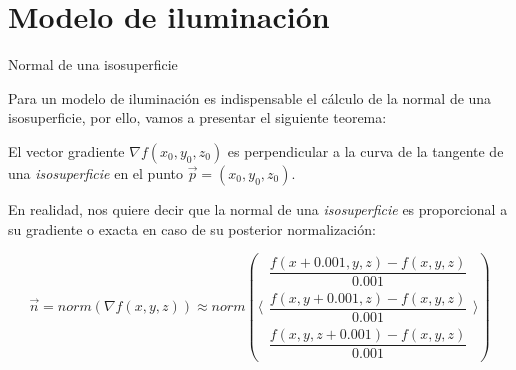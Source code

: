 \section{Modelo de iluminación}

\SectionPage

\begin{frame}{Normal de una isosuperficie}
    
    Para un modelo de iluminación es indispensable el cálculo de la normal de una isosuperficie, por ello, vamos a presentar el siguiente teorema:

    \begin{theorem}
        El vector gradiente \(\nabla f(x_0, y_0, z_0)\)  es perpendicular a la curva de la tangente de una \textit{isosuperficie} en el punto \(\Vec{p}=(x_0, y_0, z_0)\).
    \end{theorem}
    
    En realidad, nos quiere decir que la normal de una \textit{isosuperficie} es proporcional a su gradiente o exacta en caso de su posterior normalización:
    
    \[
        \Vec{n}=norm(\nabla f(x, y, z))\approx norm\left(
        \langle
        {\begin{array}{c}
        \dfrac{f(x+0.001,y,z)-f(x,y,z)}{0.001}\\
        \dfrac{f(x,y+0.001,z)-f(x,y,z)}{0.001}\\
        \dfrac{f(x,y,z+0.001)-f(x,y,z)}{0.001} \end{array}}
        \rangle\right)
    \]
    
\end{frame}


